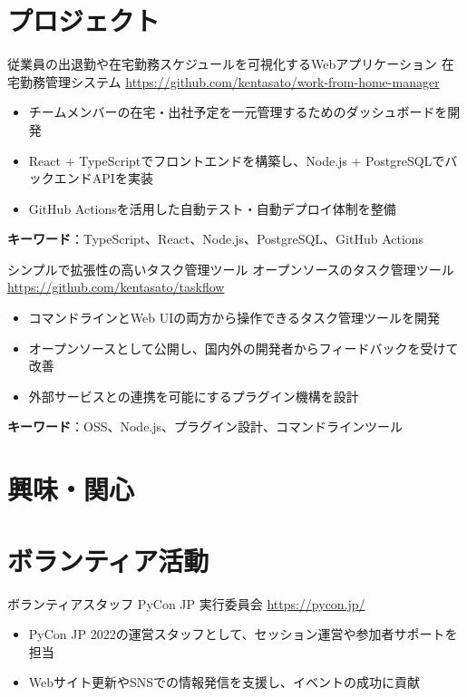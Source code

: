 \documentclass[a4paper, serif, 10pt]{moderncv}
\begin{document}
\section{プロジェクト}

        {従業員の出退勤や在宅勤務スケジュールを可視化するWebアプリケーション}
        {在宅勤務管理システム}
        {\url{https://github.com/kentasato/work-from-home-manager}}
        {}
        {\begin{itemize}
\item チームメンバーの在宅・出社予定を一元管理するためのダッシュボードを開発
\item React + TypeScriptでフロントエンドを構築し、Node.js + PostgreSQLでバックエンドAPIを実装
\item GitHub Actionsを活用した自動テスト・自動デプロイ体制を整備
\end{itemize}
\textbf{キーワード}：TypeScript、React、Node.js、PostgreSQL、GitHub Actions}

        {シンプルで拡張性の高いタスク管理ツール}
        {オープンソースのタスク管理ツール}
        {\url{https://github.com/kentasato/taskflow}}
        {}
        {\begin{itemize}
\item コマンドラインとWeb UIの両方から操作できるタスク管理ツールを開発
\item オープンソースとして公開し、国内外の開発者からフィードバックを受けて改善
\item 外部サービスとの連携を可能にするプラグイン機構を設計
\end{itemize}
\textbf{キーワード}：OSS、Node.js、プラグイン設計、コマンドラインツール}
\section{興味・関心}

\section{ボランティア活動}

        {ボランティアスタッフ}
        {PyCon JP 実行委員会}
        {\url{https://pycon.jp/}}
        {}
        {\begin{itemize}
\item PyCon JP 2022の運営スタッフとして、セッション運営や参加者サポートを担当
\item Webサイト更新やSNSでの情報発信を支援し、イベントの成功に貢献
\end{itemize}}
    
\end{document}
